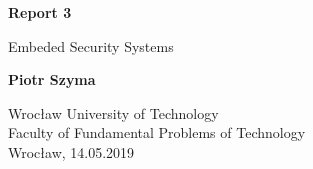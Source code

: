 \begin{titlepage}
  \begin{center}
      \vspace*{1cm}

      \textbf{Report 3}

      \vspace{0.5cm}
       Embeded Security Systems

      \vspace{1.5cm}

      \textbf{Piotr Szyma}

      \vfill

      \vspace{0.8cm}

      Wrocław University of Technology\\
      Faculty of Fundamental Problems of Technology\\
      Wrocław, 14.05.2019

  \end{center}
\end{titlepage}